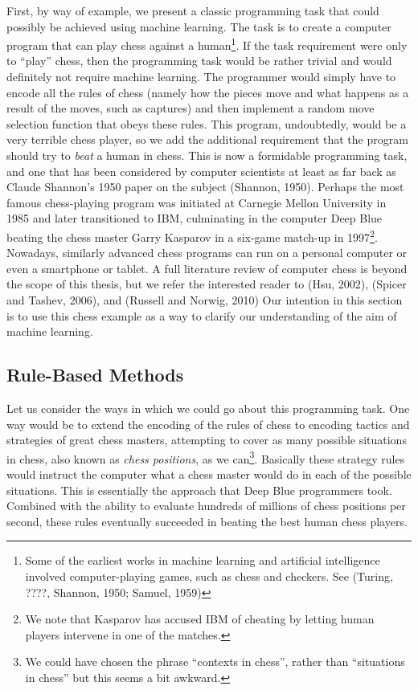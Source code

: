 First, by way of example, we present a classic programming task that could possibly be achieved using machine learning. The task is to create a computer program that can play chess against a human\footnote{Some of the earliest works in machine learning and artificial intelligence involved computer-playing games, such as chess and checkers. See (Turing, ????, Shannon, 1950; Samuel, 1959)}. If the task requirement were only to ``play'' chess, then the programming task would be rather trivial and would definitely not require machine learning. The programmer would simply have to encode all the rules of chess (namely how the pieces move and what happens as a result of the moves, such as captures) and then implement a random move selection function that obeys these rules. This program, undoubtedly, would be a very terrible chess player, so we add the additional requirement that the program should try to \emph{beat} a human in chess. This is now a formidable programming task, and one that has been considered by computer scientists at least as far back as Claude Shannon's 1950 paper on the subject (Shannon, 1950). Perhaps the most famous chess-playing program was initiated at Carnegie Mellon University in 1985 and later transitioned to IBM, culminating in the computer Deep Blue\textsuperscript{\textregistered} beating the chess master Garry Kasparov in a six-game match-up in 1997\footnote{We note that Kasparov has accused IBM of cheating by letting human players intervene in one of the matches.}. Nowadays, similarly advanced chess programs can run on a personal computer or even a smartphone or tablet. A full literature review of computer chess is beyond the scope of this thesis, but we refer the interested reader to (Hsu, 2002), (Spicer and Tashev, 2006), and (Russell and Norwig, 2010) Our intention in this section is to use this chess example as a way to clarify our understanding of the aim of machine learning.

\subsection{Rule-Based Methods}
\label{sec:rule-based}

Let us consider the ways in which we could go about this programming task. One way would be to extend the encoding of the rules of chess to encoding tactics and strategies of great chess masters, attempting to cover as many possible situations in chess, also known as \emph{chess positions}, as we can\footnote{We could have chosen the phrase ``contexts in chess'', rather than ``situations in chess'' but this seems a bit awkward.}. Basically these strategy rules would instruct the computer what a chess master would do in each of the possible situations. This is essentially the approach that Deep Blue programmers took. Combined with the ability to evaluate hundreds of millions of chess positions per second, these rules eventually succeeded in beating the best human chess players.


